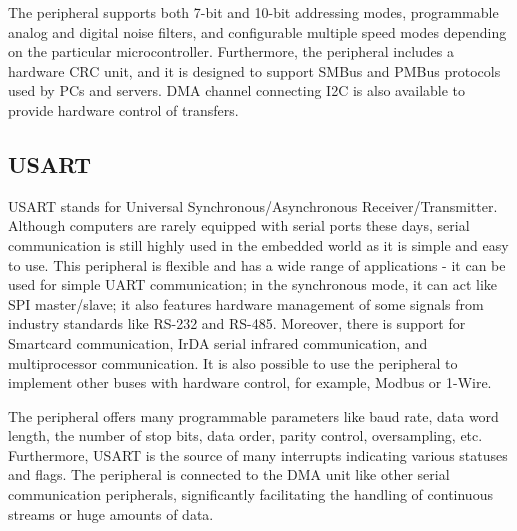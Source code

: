 The peripheral supports both 7-bit and 10-bit addressing modes, programmable analog and digital noise filters, and configurable multiple speed modes depending on the particular microcontroller. Furthermore, the peripheral includes a hardware CRC unit, and it is designed to support SMBus and PMBus protocols used by PCs and servers. DMA channel connecting I2C is also available to provide hardware control of transfers.

	\subsection{USART}
	\label{sub:usart}
USART stands for Universal Synchronous/Asynchronous Receiver/Transmitter. Although computers are rarely equipped with serial ports these days, serial communication is still highly used in the embedded world as it is simple and easy to use. This peripheral is flexible and has a wide range of applications - it can be used for simple UART communication; in the synchronous mode, it can act like SPI master/slave; it also features hardware management of some signals from industry standards like RS-232 and RS-485. Moreover, there is support for Smartcard communication, IrDA serial infrared communication, and multiprocessor communication. It is also possible to use the peripheral to implement other buses with hardware control, for example, Modbus or 1-Wire.  

The peripheral offers many programmable parameters like baud rate, data word length, the number of stop bits, data order, parity control, oversampling, etc. Furthermore, USART is the source of many interrupts indicating various statuses and flags. The peripheral is connected to the DMA unit like other serial communication peripherals, significantly facilitating the handling of continuous streams or huge amounts of data.